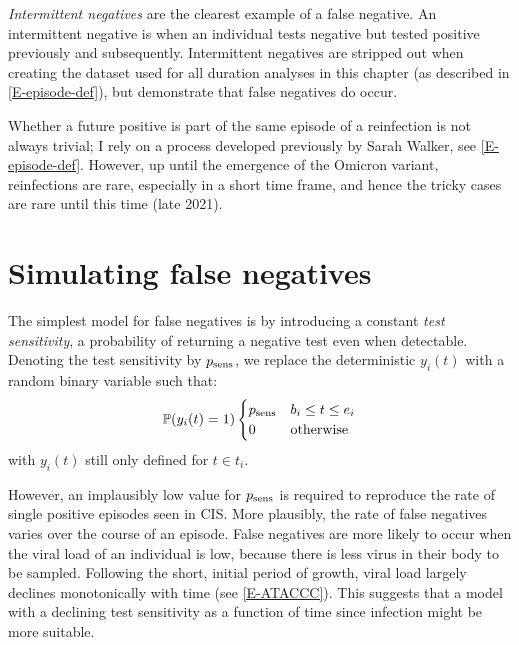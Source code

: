 \documentclass[thesis.tex]{subfiles}
\begin{document}

\emph{Intermittent negatives} are the clearest example of a false negative.
An intermittent negative is when an individual tests negative but tested positive previously and subsequently.
Intermittent negatives are stripped out when creating the dataset used for all duration analyses in this chapter (as described in \cref{E-episode-def}), but demonstrate that false negatives do occur.

Whether a future positive is part of the same episode of a reinfection is not always trivial; I rely on a process developed previously by Sarah Walker, see \cref{E-episode-def}.
However, up until the emergence of the Omicron variant, reinfections are rare, especially in a short time frame, and hence the tricky cases are rare until this time (late 2021).

\section{Simulating false negatives} \label{imperf-test:sec:simulate}

The simplest model for false negatives is by introducing a constant \emph{test sensitivity}, a probability of returning a negative test even when detectable.
Denoting the test sensitivity by $p_\text{sens}$, we replace the deterministic $y_i(t)$ with a random binary variable such that:
\begin{equation}
  \operatorname{\mathbb{P}}(y_i(t) = 1) \begin{cases}
      p_\text{sens} &b_i \leq t \leq e_i \\
      0 &\text{otherwise}
  \end{cases} 
\end{equation}
with $y_i(t)$ still only defined for $t \in t_i$.

However, an implausibly low value for $p_\text{sens}$ is required to reproduce the rate of single positive episodes seen in CIS.
More plausibly, the rate of false negatives varies over the course of an episode.
False negatives are more likely to occur when the viral load of an individual is low, because there is less virus in their body to be sampled.
Following the short, initial period of growth, viral load largely declines monotonically with time (see \cref{E-ATACCC}).
This suggests that a model with a declining test sensitivity as a function of time since infection might be more suitable.
\end{document}
